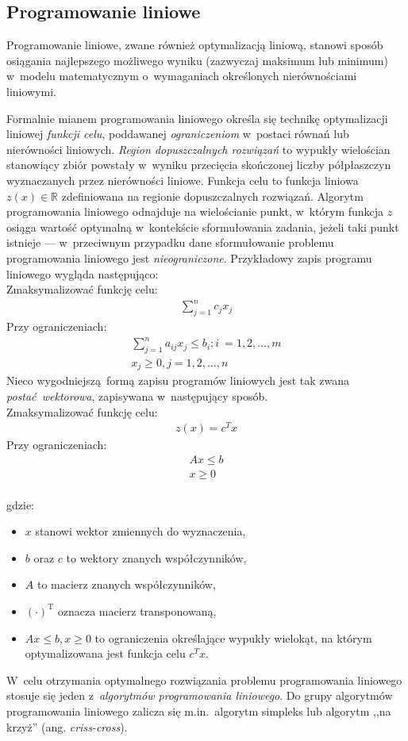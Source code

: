 \subsection{Programowanie liniowe}\label{ss_lp}
\par{
  Programowanie liniowe, zwane również optymalizacją liniową, stanowi sposób
  osiągania najlepszego możliwego wyniku (zazwyczaj maksimum lub minimum) w~modelu 
  matematycznym o~wymaganiach określonych nierównościami liniowymi.
}
\par{
  Formalnie mianem programowania liniowego określa się technikę optymalizacji liniowej \emph{funkcji celu}, poddawanej \emph{ograniczeniom} w~postaci równań lub nierówności liniowych.
  \emph{Region dopuszczalnych rozwiązań} to wypukły wielościan stanowiący zbiór powstały w~wyniku przecięcia skończonej liczby półpłaszczyn wyznaczanych przez nierówności liniowe.
  Funkcja celu to funkcja liniowa $z(x) \in \mathbb{R}$ zdefiniowana na regionie dopuszczalnych rozwiązań.
  Algorytm programowania liniowego odnajduje na wielościanie punkt, w~którym funkcja $z$ osiąga wartość optymalną w~kontekście sformułowania zadania, jeżeli taki punkt istnieje --- w~przeciwnym przypadku dane sformułowanie problemu programowania liniowego jest \emph{nieograniczone}.
  Przykładowy zapis programu liniowego wygląda następująco:\\
  Zmaksymalizować funkcję celu:
  \begin{align*}
    \sum_{j=1}^{n} c_j x_j
  \end{align*}
  Przy ograniczeniach: \begin{align*}
    \sum_{j=1}^{n}a_{ij}x_j \leq b_i; i~=1, 2, \ldots, m\\
    x_j \geq 0, j=1, 2, \ldots, n
  \end{align*}
  Nieco wygodniejszą~formą zapisu programów liniowych jest tak zwana \emph{postać~wektorowa}, zapisywana w~następujący sposób.\\
  Zmaksymalizować funkcję celu:
  \begin{align*}
    z(x)={c^T}x
  \end{align*}
  Przy ograniczeniach: \begin{align*}
    Ax \leq b\\
    x\geq 0
  \end{align*}\\
  gdzie:
  \begin{itemize}
    \item $x$ stanowi wektor zmiennych do wyznaczenia,
    \item $b$ oraz $c$ to wektory znanych współczynników,
    \item $A$ to macierz znanych współczynników,
    \item ${(\cdot)}^\mathrm{T}$ oznacza macierz transponowaną,
    \item $Ax \leq b, x\geq 0$ to ograniczenia określające wypukły wielokąt,
      na którym optymalizowana jest funkcja celu $c^{T}x$.
  \end{itemize}
  W~celu otrzymania optymalnego rozwiązania problemu programowania liniowego
  stosuje się jeden z~\emph{algorytmów programowania liniowego}.
  Do grupy algorytmów programowania liniowego zalicza się m.in.\ algorytm
  simpleks lub algorytm ,,na krzyż'' (ang. \emph{criss-cross}).
}

